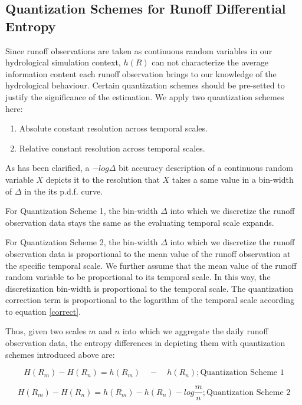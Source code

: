 \documentclass[draft,wrr]{AGUTeX}
\begin{document}
\begin{article}
\subsection{Quantization Schemes for Runoff Differential Entropy}

Since runoff observations are taken as continuous random variables in our hydrological simulation context, $h(R)$ can not characterize the average information content each runoff observation brings to our knowledge of the hydrological behaviour. Certain quantization schemes should be pre-setted to justify the significance of the estimation. We apply two quantization schemes here:
\begin{enumerate}
\item Absolute constant resolution across temporal scales.
\item Relative constant resolution across temporal scales.
\end{enumerate} 

As has been clarified, a $-log\Delta$ bit accuracy description of a continuous random variable $X$ depicts it to the resolution that $X$ takes a same value in a bin-width of $\Delta$ in the its p.d.f. curve. 

For Quantization Scheme 1,  the bin-width $\Delta$ into which we discretize the runoff observation data stays the same as the evaluating temporal scale expands. 

For Quantization Scheme 2,  the bin-width $\Delta$ into which we discretize the runoff observation data is proportional to the mean value of the runoff observation at the specific temporal scale. We further assume that the mean value of the runoff random variable to be proportional to its temporal scale. In this way, the discretization bin-width is proportional to the temporal scale. The quantization correction term is proportional to the logarithm of the temporal scale according to equation \eqref{correct}.

Thus, given two scales $m$ and $n$ into which we aggregate the daily runoff observation data, the entropy differences in depicting them with quantization schemes introduced above are:

\begin{equation}
\label{cquantization}
H(R_m)-H(R_n)=h(R_m)\quad-\quad h(R_n) ;\text{Quantization Scheme 1}
\end{equation}

\begin{equation}
\label{rquantization}
H(R_m)-H(R_n)=h(R_m)-h(R_n)-log\frac{m}{n} ;\text{Quantization Scheme 2} 
\end{equation} 



\end{article}
\end{document}
